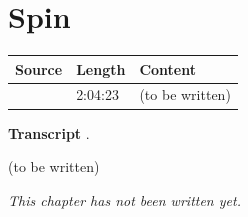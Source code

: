 \chapter{Spin}\label{ch:c33}
\begin{paracol}{2}

\begin{sources}
\begin{tabularx}{\linewidth}{@{}l l L@{}}
\toprule
\textbf{Source} & \textbf{Length} & \textbf{Content}\\
\midrule
{} & 2:04:23 & (to be written)\\
\bottomrule
\end{tabularx}

\smallskip
\textbf{Transcript} .
\end{sources}

\begin{reading}
(to be written)
\end{reading}

\emph{This chapter has not been written yet.}

\flushside
\end{paracol}
